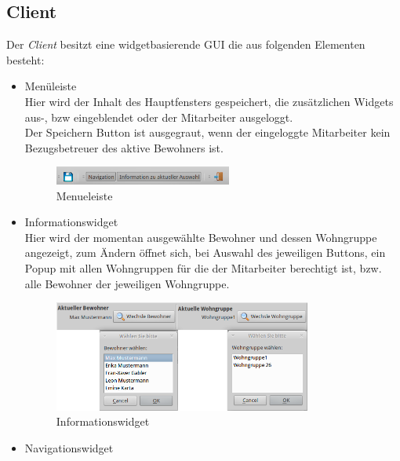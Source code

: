 \subsection{\EBP Client}
Der \EBP \textit{Client} besitzt eine widgetbasierende GUI die aus folgenden Elementen besteht:
\begin{itemize}
	\item Menüleiste\mbox{}\\
	\noindent
	Hier wird der Inhalt des Hauptfensters gespeichert, die zusätzlichen Widgets aus-, bzw eingeblendet oder der Mitarbeiter ausgeloggt.\\ Der
Speichern Button ist ausgegraut, wenn der eingeloggte Mitarbeiter kein Bezugsbetreuer des aktive Bewohners ist.
	\begin{figure}[h]
		\begin{center}
			\includegraphics[keepaspectratio=true, width=0.55\textwidth]{pics/client_header.png}
			\caption{Menueleiste}
		\end{center}
	\end{figure}
	\FloatBarrier
	\noindent
	\item Informationswidget\mbox{}\\
	Hier wird der momentan ausgewählte Bewohner und dessen Wohngruppe angezeigt, zum Ändern öffnet sich, bei Auswahl des jeweiligen Buttons, ein
Popup mit allen Wohngruppen für die der Mitarbeiter berechtigt ist, bzw. alle Bewohner der jeweiligen Wohngruppe.
	\begin{figure}[h]
		\begin{center}
			\includegraphics[keepaspectratio=true, width=0.8\textwidth]{pics/client_info.png}
			\caption{Informationswidget}
		\end{center}
	\end{figure}
	\FloatBarrier
	\newpage
	\item Navigationswidget\mbox{}\\

\end{itemize}

